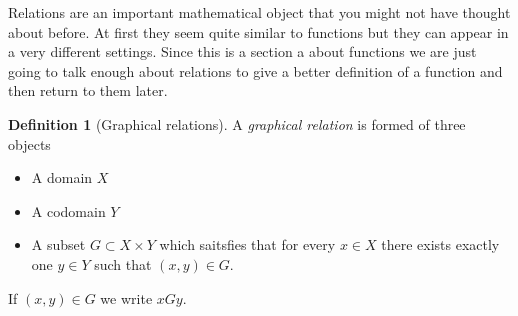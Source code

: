 \documentclass[
]{book}
\theoremstyle{definition}
\newtheorem{definition}{Definition}[chapter]
\theoremstyle{definition}
\theoremstyle{definition}
\theoremstyle{definition}
\theoremstyle{remark}
\begin{document}
Relations are an important mathematical object that you might not have thought about before. At first they seem quite similar to functions but they can appear in a very different settings. Since this is a section a about functions we are just going to talk enough about relations to give a better definition of a function and then return to them later.

\begin{definition}[Graphical relations]
A \emph{graphical relation} is formed of three objects

\begin{itemize}
\item
  A domain \(X\)
\item
  A codomain \(Y\)
\item
  A subset \(G \subset X \times Y\) which saitsfies that for every \(x \in X\) there exists exactly one \(y \in Y\) such that \((x,y) \in G\).
\end{itemize}

If \((x,y) \in G\) we write \(xGy\).
\end{definition}
\end{document}
